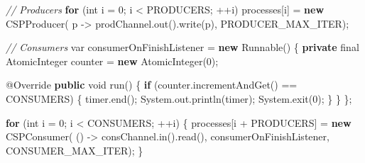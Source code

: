 \documentclass[11pt]{article}
\newenvironment{Shaded}{}{}
\newcommand{\KeywordTok}[1]{\textcolor[rgb]{0.00,0.44,0.13}{\textbf{{#1}}}}
\newcommand{\DataTypeTok}[1]{\textcolor[rgb]{0.56,0.13,0.00}{{#1}}}
\newcommand{\DecValTok}[1]{\textcolor[rgb]{0.25,0.63,0.44}{{#1}}}
\newcommand{\CommentTok}[1]{\textcolor[rgb]{0.38,0.63,0.69}{\textit{{#1}}}}
\newcommand{\FunctionTok}[1]{\textcolor[rgb]{0.02,0.16,0.49}{{#1}}}
\newcommand{\NormalTok}[1]{{#1}}
\newcommand{\ControlFlowTok}[1]{\textcolor[rgb]{0.00,0.44,0.13}{\textbf{{#1}}}}
\newcommand{\OperatorTok}[1]{\textcolor[rgb]{0.40,0.40,0.40}{{#1}}}
\newcommand{\BuiltInTok}[1]{{#1}}
\newcommand{\AttributeTok}[1]{\textcolor[rgb]{0.49,0.56,0.16}{{#1}}}
\begin{document}
\begin{Shaded}
\begin{Highlighting}[]
        \CommentTok{// Producers}
        \ControlFlowTok{for} \OperatorTok{(}\DataTypeTok{int}\NormalTok{ i }\OperatorTok{=} \DecValTok{0}\OperatorTok{;}\NormalTok{ i }\OperatorTok{\textless{}}\NormalTok{ PRODUCERS}\OperatorTok{;} \OperatorTok{++}\NormalTok{i}\OperatorTok{)}
\NormalTok{            processes}\OperatorTok{[}\NormalTok{i}\OperatorTok{]} \OperatorTok{=} \KeywordTok{new} \FunctionTok{CSPProducer}\OperatorTok{(}
\NormalTok{                p }\OperatorTok{{-}\textgreater{}}\NormalTok{ prodChannel}\OperatorTok{.}\FunctionTok{out}\OperatorTok{().}\FunctionTok{write}\OperatorTok{(}\NormalTok{p}\OperatorTok{),}
\NormalTok{                PRODUCER\_MAX\_ITER}\OperatorTok{);}

        \CommentTok{// Consumers}
        \DataTypeTok{var}\NormalTok{ consumerOnFinishListener }\OperatorTok{=} \KeywordTok{new} \BuiltInTok{Runnable}\OperatorTok{()} \OperatorTok{\{}
            \KeywordTok{private} \DataTypeTok{final} \BuiltInTok{AtomicInteger}\NormalTok{ counter }\OperatorTok{=} \KeywordTok{new} \BuiltInTok{AtomicInteger}\OperatorTok{(}\DecValTok{0}\OperatorTok{);}

            \AttributeTok{@Override}
            \KeywordTok{public} \DataTypeTok{void} \FunctionTok{run}\OperatorTok{()} \OperatorTok{\{}
                \ControlFlowTok{if} \OperatorTok{(}\NormalTok{counter}\OperatorTok{.}\FunctionTok{incrementAndGet}\OperatorTok{()} \OperatorTok{==}\NormalTok{ CONSUMERS}\OperatorTok{)} \OperatorTok{\{}
\NormalTok{                    timer}\OperatorTok{.}\FunctionTok{end}\OperatorTok{();}
                    \BuiltInTok{System}\OperatorTok{.}\FunctionTok{out}\OperatorTok{.}\FunctionTok{println}\OperatorTok{(}\NormalTok{timer}\OperatorTok{);}
                    \BuiltInTok{System}\OperatorTok{.}\FunctionTok{exit}\OperatorTok{(}\DecValTok{0}\OperatorTok{);}
                \OperatorTok{\}}
            \OperatorTok{\}}
        \OperatorTok{\};}

        \ControlFlowTok{for} \OperatorTok{(}\DataTypeTok{int}\NormalTok{ i }\OperatorTok{=} \DecValTok{0}\OperatorTok{;}\NormalTok{ i }\OperatorTok{\textless{}}\NormalTok{ CONSUMERS}\OperatorTok{;} \OperatorTok{++}\NormalTok{i}\OperatorTok{)} \OperatorTok{\{}
\NormalTok{            processes}\OperatorTok{[}\NormalTok{i }\OperatorTok{+}\NormalTok{ PRODUCERS}\OperatorTok{]} \OperatorTok{=} \KeywordTok{new} \FunctionTok{CSPConsumer}\OperatorTok{(}
                    \OperatorTok{()} \OperatorTok{{-}\textgreater{}}\NormalTok{ consChannel}\OperatorTok{.}\FunctionTok{in}\OperatorTok{().}\FunctionTok{read}\OperatorTok{(),}
\NormalTok{                    consumerOnFinishListener}\OperatorTok{,}
\NormalTok{                    CONSUMER\_MAX\_ITER}\OperatorTok{);}
        \OperatorTok{\}}


\end{Highlighting}
\end{Shaded}
\end{document}
